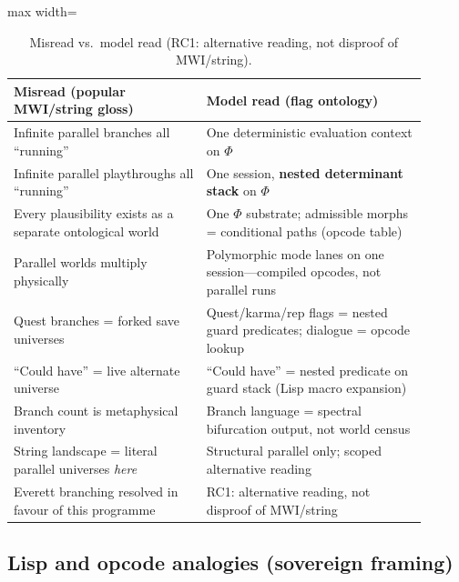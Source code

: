 \documentclass[11pt,a4paper]{article}
\theoremstyle{remark}
\theoremstyle{definition}
\begin{document}
\begin{table}[H]
\centering
\caption{Misread vs.\ model read (RC1: alternative reading, not disproof of MWI/string).}
\label{tab:misread}
\small
\begin{adjustbox}{max width=\linewidth}\begin{tabular}{@{}p{0.42\linewidth}p{0.48\linewidth}@{}}
\toprule
\textbf{Misread (popular MWI/string gloss)} & \textbf{Model read (flag ontology)} \\
\midrule
Infinite parallel branches all ``running'' &
One deterministic evaluation context on $\Phi$ \\
Infinite parallel playthroughs all ``running'' &
One session, \textbf{nested determinant stack} on $\Phi$ \\
Every plausibility exists as a separate ontological world &
One $\Phi$ substrate; admissible morphs = conditional paths (opcode table) \\
Parallel worlds multiply physically &
Polymorphic mode lanes on one session---compiled opcodes, not parallel runs \\
Quest branches = forked save universes &
Quest/karma/rep flags = nested guard predicates; dialogue = opcode lookup \\
``Could have'' = live alternate universe &
``Could have'' = nested predicate on guard stack (Lisp macro expansion) \\
Branch count is metaphysical inventory &
Branch language = spectral bifurcation output, not world census \\
String landscape = literal parallel universes \emph{here} &
Structural parallel only; scoped alternative reading \\
Everett branching resolved in favour of this programme &
RC1: alternative reading, not disproof of MWI/string \\
\bottomrule
\end{tabular}\end{adjustbox}
\end{table}

\subsection{Lisp and opcode analogies (sovereign framing)}
\end{document}
